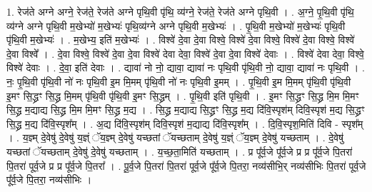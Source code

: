 \documentclass[17pt]{extarticle}
\begin{document}
1. रेज॑ते अग्ने अग्ने॒ रेज॑ते॒ रेज॑ते अग्ने पृथि॒वी पृ॑थि॒ व्य॑ग्ने॒ रेज॑ते॒ रेज॑ते अग्ने पृथि॒वी । . अ॒ग्ने॒ पृ॒थि॒वी पृ॑थि॒ व्य॑ग्ने अग्ने पृथि॒वी म॒खेभ्यो॑ म॒खेभ्यः॑ पृथि॒व्य॑ग्ने अग्ने पृथि॒वी म॒खेभ्यः॑ । . पृ॒थि॒वी म॒खेभ्यो॑ म॒खेभ्यः॑ पृथि॒वी पृ॑थि॒वी म॒खेभ्यः॑ । . म॒खेभ्य॒ इति॑ म॒खेभ्यः॑ । . विश्वे॑ दे॒वा दे॒वा विश्वे॒ विश्वे॑ दे॒वा विश्वे॒ विश्वे॑ दे॒वा विश्वे॒ विश्वे॑ दे॒वा विश्वे᳚ । . दे॒वा विश्वे॒ विश्वे॑ दे॒वा दे॒वा विश्वे॑ देवा देवा॒ विश्वे॑ दे॒वा दे॒वा विश्वे॑ देवाः । . विश्वे॑ देवा देवा॒ विश्वे॒ विश्वे॑ देवाः । . दे॒वा॒ इति॑ देवाः । . द्यावा॑ नो नो॒ द्यावा॒ द्यावा॑ नः पृथि॒वी पृ॑थि॒वी नो॒ द्यावा॒ द्यावा॑ नः पृथि॒वी । . नः॒ पृ॒थि॒वी पृ॑थि॒वी नो॑ नः पृथि॒वी इ॒म मि॒मम् पृ॑थि॒वी नो॑ नः पृथि॒वी इ॒मम् । . पृ॒थि॒वी इ॒म मि॒मम् पृ॑थि॒वी पृ॑थि॒वी इ॒मꣳ सि॒द्ध्रꣳ सि॒द्ध्र मि॒मम् पृ॑थि॒वी पृ॑थि॒वी इ॒मꣳ सि॒द्ध्रम् । . पृ॒थि॒वी इति॑ पृथि॒वी । . इ॒मꣳ सि॒द्ध्रꣳ सि॒द्ध्र मि॒म मि॒मꣳ सि॒द्ध्र म॒द्याद्य सि॒द्ध्र मि॒म मि॒मꣳ सि॒द्ध्र म॒द्य । . सि॒द्ध्र म॒द्याद्य सि॒द्ध्रꣳ सि॒द्ध्र म॒द्य दि॑वि॒स्पृश॑म् दिवि॒स्पृश॑ म॒द्य सि॒द्ध्रꣳ सि॒द्ध्र म॒द्य दि॑वि॒स्पृश᳚म् । . अ॒द्य दि॑वि॒स्पृश॑म् दिवि॒स्पृश॑ म॒द्याद्य दि॑वि॒स्पृश᳚म् । . दि॒वि॒स्पृश॒मिति॑ दिवि - स्पृश᳚म् । . य॒ज्ञ्म् दे॒वेषु॑ दे॒वेषु॑ य॒ज्ञ्ं ॅय॒ज्ञ्म् दे॒वेषु॑ यच्छतां ॅयच्छताम् दे॒वेषु॑ य॒ज्ञ्ं ॅय॒ज्ञ्म् दे॒वेषु॑ यच्छताम् । . दे॒वेषु॑ यच्छतां ॅयच्छताम् दे॒वेषु॑ दे॒वेषु॑ यच्छताम् । . य॒च्छ॒ता॒मिति॑ यच्छताम् । . प्र पू᳚र्व॒जे पू᳚र्व॒जे प्र प्र पू᳚र्व॒जे पि॒तरा॑ पि॒तरा॑ पूर्व॒जे प्र प्र पू᳚र्व॒जे पि॒तरा᳚ । . पू॒र्व॒जे पि॒तरा॑ पि॒तरा॑ पूर्व॒जे पू᳚र्व॒जे पि॒तरा॒ नव्य॑सीभि॒र् नव्य॑सीभिः पि॒तरा॑ पूर्व॒जे पू᳚र्व॒जे पि॒तरा॒ नव्य॑सीभिः । \newline
\end{document}
